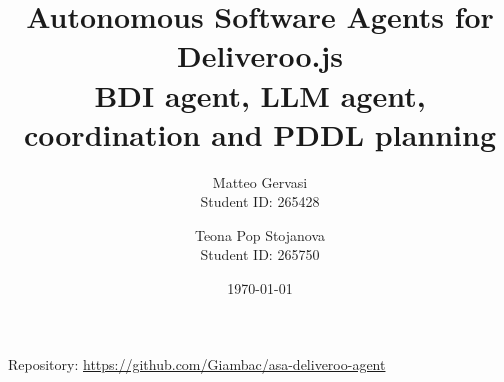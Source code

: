 \documentclass[10pt,a4paper]{article}
\title{Autonomous Software Agents for Deliveroo.js\\
  \large BDI agent, LLM agent, coordination and PDDL planning}
\author{
  Matteo Gervasi \\ Student ID: 265428
  \and
  Teona Pop Stojanova \\ Student ID: 265750
}
\date{\today}
\begin{document}
\maketitle

\begin{center}
  Repository: \url{https://github.com/Giambac/asa-deliveroo-agent}
\end{center}









\end{document}
